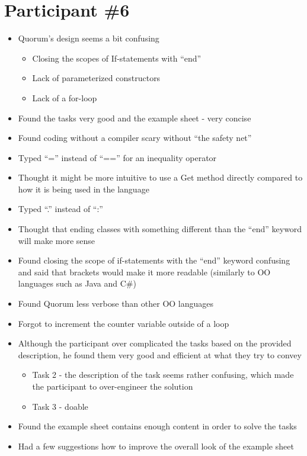 \section{Participant {\#}6}
\begin{itemize}
\item Quorum’s design  seems a bit confusing
	\begin{itemize}
		\item Closing the scopes of If-statements with “end”
		\item Lack of parameterized constructors
		\item Lack of a for-loop
	\end{itemize}
\item Found the tasks very good and the example sheet - very concise
\item Found coding without a compiler scary without “the safety net”
\item Typed “=” instead of “==” for an inequality operator
\item Thought it might be more intuitive to use a Get method directly compared to how it is being used in the language
\item Typed “.” instead of “:”
\item Thought that ending classes with something different than the “end” keyword will make more sense
\item Found closing the scope of if-statements with the “end” keyword confusing and said that brackets would make it more readable (similarly to OO languages such as Java and C\#)
\item Found Quorum less verbose than other OO languages
\item Forgot to increment the counter variable outside of a loop
\item Although the participant over complicated the tasks based on the provided description, he found them very good and efficient at what they try to convey
	\begin{itemize}
		\item Task 2 - the description of the task seems rather confusing, which made the participant to over-engineer the solution
		\item Task 3 - doable 
	\end{itemize}
\item Found the example sheet contains enough content in order to solve the tasks  
\item Had a few suggestions how to improve the overall look of the example sheet
\end{itemize}

